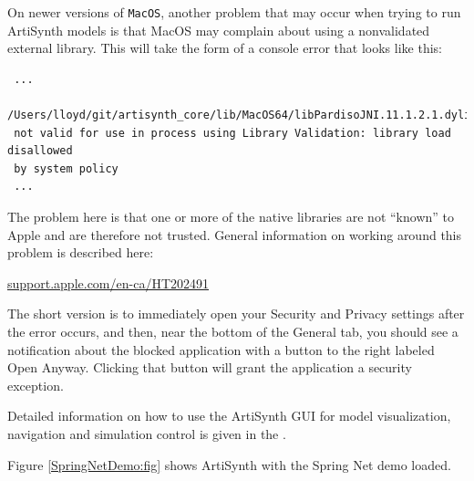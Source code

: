 \begin{sideblock}
On newer versions of {\tt MacOS}, another problem that may occur when
trying to run ArtiSynth models is that MacOS may complain about using
a nonvalidated external library. This will take the form of a console
error that looks like this:
\begin{verbatim}
 ...
 /Users/lloyd/git/artisynth_core/lib/MacOS64/libPardisoJNI.11.1.2.1.dylib)
 not valid for use in process using Library Validation: library load disallowed
 by system policy 
 ...
\end{verbatim}
The problem here is that one or more of the native libraries are not
``known'' to Apple and are therefore not trusted. General information
on working around this problem is described here:

\href{https://support.apple.com/en-ca/HT202491}{support.apple.com/en-ca/HT202491}

The short version is to immediately open your Security and Privacy
settings after the error occurs, and then, near the bottom of the {\sf
General} tab, you should see a notification about the blocked
application with a button to the right labeled {\sf Open
Anyway}. Clicking that button will grant the application a security
exception.
\end{sideblock}

\fi

Detailed information on how to use the ArtiSynth GUI for model
visualization, navigation and simulation control is given in the
.

Figure \ref{SpringNetDemo:fig} shows ArtiSynth with the {\sf Spring
Net} demo loaded.

